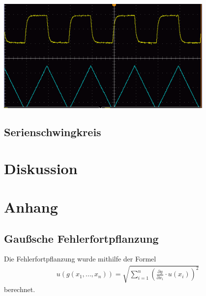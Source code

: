 \documentclass[11pt, a4paper]{article}
\begin{document}
    \begin{image}[h]
        \centering
        \includegraphics[width=0.8\textwidth]{Hochpass_differenzierend_tri.png}
        \caption{Hochpass mit 1 \si{\kilo\hertz} Dreieckssignal}
        \label{im:Hotri}
    \end{image}

    \subsection{Serienschwingkreis}

    

    \section{Diskussion}

    \section{Anhang}
    \subsection{Gaußsche Fehlerfortpflanzung}
    Die Fehlerfortpflanzung wurde mithilfe der Formel
    \begin{align}
        u\left(g \left(x_1, ..., x_n\right)\right) = \sqrt{\sum_{i=1}^n \left( \frac{\partial g }{\partial x_i} \cdot u\left(x_i\right) \right)^2} \label{gauss}
    \end{align}
    berechnet.

    
    
\end{document}
